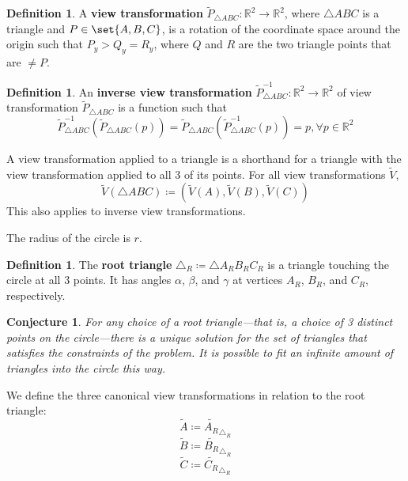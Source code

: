 \documentclass[a4paper,12pt]{article}
\newcommand{\HSview}[1][V]{\widetilde{#1}}
\newtheorem{conjecture}[theorem]{Conjecture}
\theoremstyle{definition}
\newtheorem{definition}[theorem]{Definition}
\theoremstyle{plain}
\begin{document}
	\begin{definition}
		A \textbf{view transformation} $\widetilde{P}_{\triangle ABC} : \mathbb{R}^2 \to \mathbb{R}^2$, where $\triangle ABC$ is a triangle and $P \in \set{A, B, C}$,
		is a rotation of the coordinate space around the origin such that $P_y > Q_y = R_y$, where $Q$ and $R$ are the two triangle points that are $\neq P$.
	\end{definition}
	
	\begin{definition}
		An \textbf{inverse view transformation} $\widetilde{P}_{\triangle ABC}^{-1} : \mathbb{R}^2 \to \mathbb{R}^2$
		of view transformation $\widetilde{P}_{\triangle ABC}$ is a function such that
		$$\widetilde{P}_{\triangle ABC}^{-1}\left(\widetilde{P}_{\triangle ABC}\left(p\right)\right) =
		  \widetilde{P}_{\triangle ABC}\left(\widetilde{P}_{\triangle ABC}^{-1}\left(p\right)\right) =
		  p, \forall p \in \mathbb{R}^2$$
	\end{definition}

	A view transformation applied to a triangle is a shorthand for a triangle with the view transformation applied to all 3 of its points.
	For all view transformations $\HSview$, $$\HSview\left(\triangle ABC\right) \coloneqq \left(\HSview\left(A\right), \HSview\left(B\right), \HSview\left(C\right)\right)$$
	This also applies to inverse view transformations.

	The radius of the circle is $r$.

	\begin{definition}
		The \textbf{root triangle} $\triangle_R \coloneqq \triangle A_R B_R C_R$ is a triangle touching the circle at all 3 points.
		It has angles $\alpha$, $\beta$, and $\gamma$ at vertices $A_R$, $B_R$, and $C_R$, respectively.
	\end{definition}

	\begin{conjecture}\label{uniqueness-conjecture}
		For any choice of a root triangle---that is, a choice of 3 distinct points on the circle---there is a unique solution for the set of triangles that satisfies the constraints of the problem.
		It is possible to fit an infinite amount of triangles into the circle this way.
	\end{conjecture}

	We define the three canonical view transformations in relation to the root triangle:
	$$\widetilde{A} \coloneqq {\widetilde{A_R}} _ {\triangle_R}$$
	$$\widetilde{B} \coloneqq {\widetilde{B_R}} _ {\triangle_R}$$
	$$\widetilde{C} \coloneqq {\widetilde{C_R}} _ {\triangle_R}$$
\end{document}
